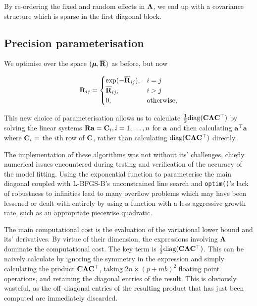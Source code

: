 	By re-ordering the fixed and random effects in ${\boldsymbol \Lambda}$, we end up with a covariance structure which is 
	sparse in the first diagonal block.
	
	\subsection{Precision parameterisation}
	
	We optimise over the space $({\boldsymbol \mu}, \overline{{\bf R}})$ as before, but now 
			
	\begin{equation*}
		{\bf R}_{ij} =
		\begin{cases}
			\exp(-\overline{{\bf R}}_{ij}), & i = j             \\
			\overline{{\bf R}}_{ij},        & i > j             \\
			0,                          & \text{otherwise}, 
		\end{cases}
	\end{equation*}
		
	\noindent This new choice of parameterisation allows us to calculate $\frac{1}{2} \text{diag}({\bf C} {\boldsymbol \Lambda}
	{\bf C}^\top)$ by solving the linear systems ${\bf R} {\bf a} = {\bf C}_{i}, i=1, \ldots, n$ for   ${\bf a}$ and then calculating
	${\bf a}^\top{\bf a}$ where ${\bf C}_{i} = $ the $i$th row of ${\bf C}$, rather than calculating $\text{diag}({\bf C} {\boldsymbol \Lambda}
	{\bf C}^\top)$ directly.
		
	The implementation of these algorithms was not without its' challenges, chiefly numerical issues encountered during testing and verification of the accuracy of the model fitting. Using the exponential function to parameterise the main diagonal coupled with L-BFGS-B's unconstrained line search and \texttt{optim()}'s lack of robustness to infinities lead to many overflow problems which may have been lessened or dealt with entirely by using a function with a less aggressive growth rate, such as an appropriate piecewise quadratic.
		
	The main computational cost is the evaluation of the variational lower bound and its' derivatives. By
	virtue of their dimension, the expressions involving ${\boldsymbol \Lambda}$ dominate the computational cost. The key
	term is $\frac{1}{2} \text{diag}({\bf C} {\boldsymbol \Lambda} {\bf C}^\top)$. This can be naively calculate by ignoring the
	symmetry in the expression and simply calculating the product ${\bf C} {\boldsymbol \Lambda} {\bf C}^\top$, taking $2 n
	\times (p + m b)^2$ floating point operations, and retaining the diagonal entries of the result. This is
	obviously wasteful, as the off--diagonal entries of the resulting product that has just been computed
	are immediately discarded.
		

